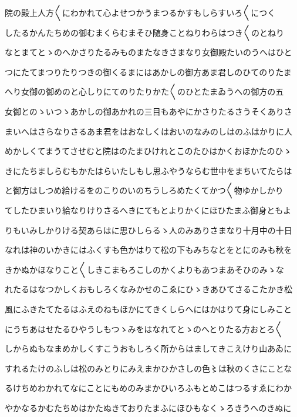 \documentclass[a4paper,11pt,landscape]{ltjtarticle}
\begin{document}
\par\medskip
院の殿上人方〱にわかれて心よせつかうまつるかすもしらすいろ〱につく
\par\medskip
したるかんたちめの御むまくらむまそひ随身ことねりわらはつき〱のとねり
\par\medskip
なとまてとゝのへかさりたるみものまたなきさまなり女御殿たいのうへはひと
\par\medskip
つにたてまつりたりつきの御くるまにはあかしの御方あま君しのひてのりたま
\par\medskip
へり女御の御めのと心しりにてのりたりかた〱のひとたまゐうへの御方の五
\par\medskip
女御とのゝいつゝあかしの御あかれの三目もあやにかさりたるさうそくありさ
\par\medskip
まいへはさらなりさるあま君をはおなしくはおいのなみのしはのふはかりに人
\par\medskip
めかしくてまうてさせむと院はのたまひけれとこのたひはかくおほかたのひゝ
\par\medskip
きにたちましらむもかたはらいたしもし思ふやうならむ世中をまちいてたらは
\par\medskip
と御方はしつめ給けるをのこりのいのちうしろめたくてかつ〱物ゆかしかり
\par\medskip
てしたひまいり給なりけりさるへきにてもとよりかくにほひたまふ御身ともよ
\par\medskip
りもいみしかりける契あらはに思ひしらるゝ人のみありさまなり十月中の十日
\par\medskip
なれは神のいかきにはふくすも色かはりて松の下もみちなとをとにのみも秋を
\par\medskip
きかぬかほなりこと〱しきこまもろこしのかくよりもあつまあそひのみゝな
\par\medskip
れたるはなつかしくおもしろくなみかせのこゑにひゝきあひてさるこたかき松
\par\medskip
風にふきたてたるはふえのねもほかにてきくしらへにはかはりて身にしみこと
\par\medskip
にうちあはせたるひやうしもつゝみをはなれてとゝのへとりたる方おとろ〱
\par\medskip
しからぬもなまめかしくすこうおもしろく所からはましてきこえけり山あゐに
\par\medskip
すれるたけのふしは松のみとりにみえまかひかさしの色〻は秋のくさにことな
\par\medskip
るけちめわかれてなにことにもめのみまかひいろふもとめこはつるすゑにわか
\par\medskip
やかなるかむたちめはかたぬきておりたまふにほひもなくゝろきうへのきぬに
\par\medskip
\end{document}
